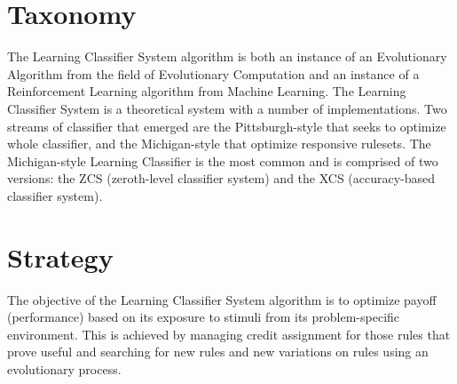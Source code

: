 \documentclass[a4paper, 11pt]{article}
\begin{document}
\section{Taxonomy}
\label{sec:taxonomy}
The Learning Classifier System algorithm is both an instance of an Evolutionary Algorithm from the field of Evolutionary Computation and an instance of a Reinforcement Learning algorithm from Machine Learning.
The Learning Classifier System is a theoretical system with a number of implementations. Two streams of classifier that emerged are the Pittsburgh-style that seeks to optimize whole classifier, and the Michigan-style that optimize responsive rulesets. 
The Michigan-style Learning Classifier is the most common and is comprised of two versions: the ZCS (zeroth-level classifier system) and the XCS (accuracy-based classifier system).

\section{Strategy}
\label{sec:strategy}
The objective of the Learning Classifier System algorithm is to optimize payoff (performance) based on its exposure to stimuli from its problem-specific  environment.
This is achieved by managing credit assignment for those rules that prove useful and searching for new rules and new variations on rules using an evolutionary process.
\end{document}
